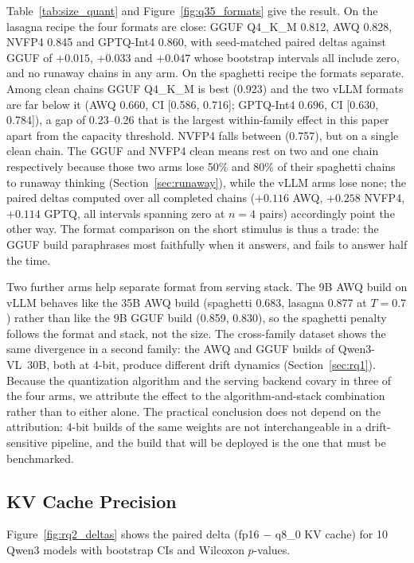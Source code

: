 \documentclass[11pt]{article}
\begin{document}
Table~\ref{tab:size_quant} and Figure~\ref{fig:q35_formats} give the result.
On the lasagna recipe the four formats are close: GGUF Q4\_K\_M 0.812, AWQ
0.828, NVFP4 0.845 and GPTQ-Int4 0.860, with seed-matched paired deltas
against GGUF of $+0.015$, $+0.033$ and $+0.047$ whose bootstrap intervals all
include zero, and no runaway chains in any arm. On the spaghetti recipe the
formats separate. Among clean chains GGUF Q4\_K\_M is best (0.923) and the
two vLLM formats are far below it (AWQ 0.660, CI [0.586, 0.716]; GPTQ-Int4
0.696, CI [0.630, 0.784]), a gap of 0.23--0.26 that is the largest
within-family effect in this paper apart from the capacity threshold. NVFP4
falls between (0.757), but on a single clean chain. The GGUF and NVFP4 clean
means rest on two and one chain respectively because those two arms lose
50\% and 80\% of their spaghetti chains to runaway thinking
(Section~\ref{sec:runaway}), while the vLLM arms lose none; the paired
deltas computed over all completed chains ($+0.116$ AWQ, $+0.258$ NVFP4,
$+0.114$ GPTQ, all intervals spanning zero at $n=4$ pairs) accordingly point
the other way. The format comparison on the short stimulus is thus a
trade: the GGUF build paraphrases most faithfully when it answers, and fails
to answer half the time.

Two further arms help separate format from serving stack. The 9B AWQ build
on vLLM behaves like the 35B AWQ build (spaghetti 0.683, lasagna 0.877 at
$T=0.7$) rather than like the 9B GGUF build (0.859, 0.830), so the
spaghetti penalty follows the format and stack, not the size. The
cross-family dataset shows the same divergence in a second family: the AWQ
and GGUF builds of Qwen3-VL~30B, both at 4-bit, produce different drift
dynamics (Section~\ref{sec:rq1}). Because the quantization algorithm and the
serving backend covary in three of the four arms, we attribute the effect to
the algorithm-and-stack combination rather than to either alone. The
practical conclusion does not depend on the attribution: 4-bit builds of the
same weights are not interchangeable in a drift-sensitive pipeline, and the
build that will be deployed is the one that must be benchmarked.


\subsection{KV Cache Precision}
\label{sec:rq2}

Figure~\ref{fig:rq2_deltas} shows the paired delta (fp16 $-$ q8\_0 KV cache)
for 10 Qwen3 models with bootstrap CIs and Wilcoxon $p$-values.
\end{document}

